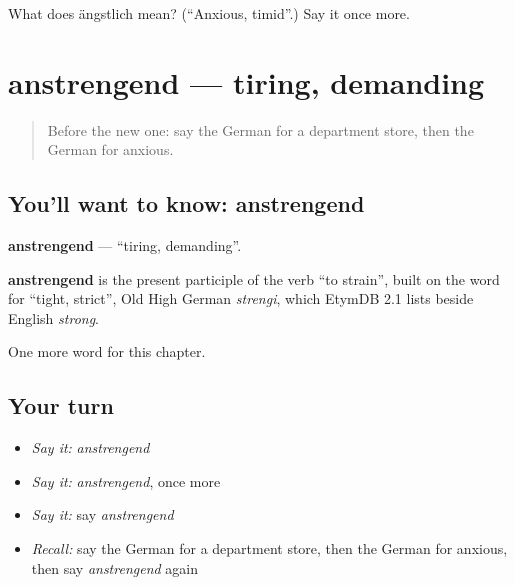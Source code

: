 \begin{tcolorbox}[breakable,colback=teal!4,colframe=teal!35!black,title={Before you move on}]
What does ängstlich mean? (\textquotedblleft{}Anxious, timid\textquotedblright{}.) Say it once more.
\end{tcolorbox}
\section[anstrengend]{anstrengend — tiring, demanding}

\label{lesson:GE-C211-anstrengend}



\begin{quote}
Before the new one: say the German for a department store, then the German for anxious.
\end{quote}

\subsection*{You'll want to know: anstrengend}
\textbf{anstrengend} — \textquotedblleft{}tiring, demanding\textquotedblright{}.

\begin{cousinweb}
\textbf{anstrengend} is the present participle of the verb \textquotedblleft{}to strain\textquotedblright{}, built on the word for \textquotedblleft{}tight, strict\textquotedblright{}, Old High German \emph{strengi}, which EtymDB 2.1 lists beside English \emph{strong}.
\end{cousinweb}

\begin{grammarlens}[title={What you've built}]
One more word for this chapter.
\end{grammarlens}

\subsection*{Your turn}
\begin{itemize}
\raggedright
  \item \emph{Say it:} \emph{anstrengend}
  \item \emph{Say it:} \emph{anstrengend}, once more
  \item \emph{Say it:} say \emph{anstrengend}
  \item \emph{Recall:} say the German for a department store, then the German for anxious, then say \emph{anstrengend} again
\end{itemize}

